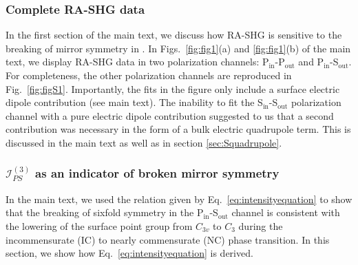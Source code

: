 \subsubsection{Complete RA-SHG data\label{sec:complete_a}}
In the first section of the main text, we discuss how RA-SHG is sensitive to the breaking of mirror symmetry in \tastwo.
In Figs.~\ref{fig:fig1}(a) and \ref{fig:fig1}(b) of the main text, we display RA-SHG data in two polarization channels: P$_\mathrm{in}$-P$_\mathrm{out}$ and P$_\mathrm{in}$-S$_\mathrm{out}$.
For completeness, the other polarization channels are reproduced in Fig.~\ref{fig:figS1}.
Importantly, the fits in the figure only include a surface electric dipole contribution (see main text).
The inability to fit the S$_\mathrm{in}$-S$_\mathrm{out}$ polarization channel with a pure electric dipole contribution suggested to us that a second contribution was necessary in the form of a bulk electric quadrupole term.
This is discussed in the main text as well as in section \ref{sec:Squadrupole}.

\subsubsection{$\mathscr{I}_{PS}^{(3)}$ as an indicator of broken mirror symmetry\label{sec:Sbmsindicator}}

In the main text, we used the relation given by Eq.~\ref{eq:intensityequation} to show that the breaking of sixfold symmetry in the P$_\mathrm{in}$-S$_\mathrm{out}$ channel is consistent with the lowering of the surface point group from $C_{3v}$ to $C_3$ during the incommensurate (IC) to nearly commensurate (NC) phase transition.
In this section, we show how Eq.~\ref{eq:intensityequation} is derived.

